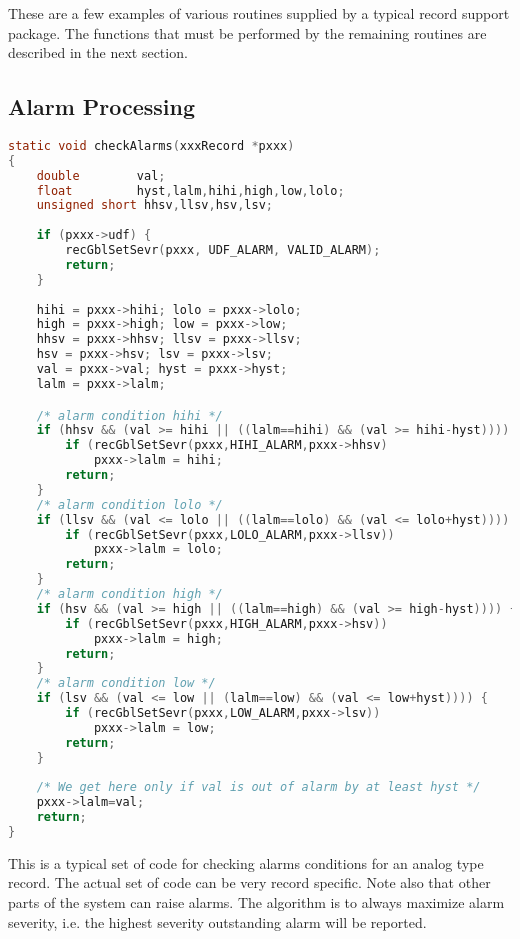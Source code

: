 These are a few examples of various routines supplied by a typical record support package.
The functions that must be performed by the remaining routines are described in the next section.

\subsection{Alarm Processing}

\begin{lstlisting}[language=C]
static void checkAlarms(xxxRecord *pxxx)
{
    double        val;
    float         hyst,lalm,hihi,high,low,lolo;
    unsigned short hhsv,llsv,hsv,lsv;
    
    if (pxxx->udf) {
        recGblSetSevr(pxxx, UDF_ALARM, VALID_ALARM);
        return;
    }
    
    hihi = pxxx->hihi; lolo = pxxx->lolo;
    high = pxxx->high; low = pxxx->low;
    hhsv = pxxx->hhsv; llsv = pxxx->llsv;
    hsv = pxxx->hsv; lsv = pxxx->lsv;
    val = pxxx->val; hyst = pxxx->hyst;
    lalm = pxxx->lalm;

    /* alarm condition hihi */
    if (hhsv && (val >= hihi || ((lalm==hihi) && (val >= hihi-hyst)))) {
        if (recGblSetSevr(pxxx,HIHI_ALARM,pxxx->hhsv)
            pxxx->lalm = hihi;
        return;
    }
    /* alarm condition lolo */
    if (llsv && (val <= lolo || ((lalm==lolo) && (val <= lolo+hyst)))) {
        if (recGblSetSevr(pxxx,LOLO_ALARM,pxxx->llsv))
            pxxx->lalm = lolo;
        return;
    }
    /* alarm condition high */
    if (hsv && (val >= high || ((lalm==high) && (val >= high-hyst)))) {
        if (recGblSetSevr(pxxx,HIGH_ALARM,pxxx->hsv))
            pxxx->lalm = high;
        return;
    }
    /* alarm condition low */
    if (lsv && (val <= low || (lalm==low) && (val <= low+hyst)))) {
        if (recGblSetSevr(pxxx,LOW_ALARM,pxxx->lsv))
            pxxx->lalm = low;
        return;
    }
    
    /* We get here only if val is out of alarm by at least hyst */
    pxxx->lalm=val;
    return;
}
\end{lstlisting}

This is a typical set of code for checking alarms conditions for an analog type record.
The actual set of code can be very record specific.
Note also that other parts of the system can raise alarms.
The algorithm is to always maximize alarm severity, i.e. the highest severity outstanding alarm will be reported.

